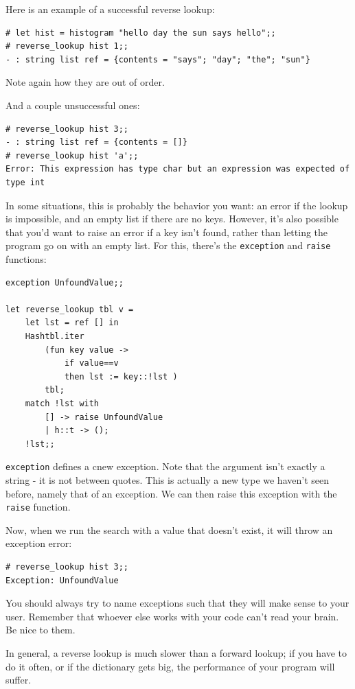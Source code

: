 \documentclass[10pt]{book}
\begin{document}
{Here is an example of a successful reverse lookup:

\beforeverb
\begin{verbatim}
# let hist = histogram "hello day the sun says hello";;
# reverse_lookup hist 1;;
- : string list ref = {contents = "says"; "day"; "the"; "sun"}
\end{verbatim}
\afterverb
%
Note again how they are out of order.

And a couple unsuccessful ones:

\beforeverb
\begin{verbatim}
# reverse_lookup hist 3;;
- : string list ref = {contents = []}
# reverse_lookup hist 'a';;
Error: This expression has type char but an expression was expected of type int
\end{verbatim}
\afterverb
%
In some situations, this is probably the behavior you want: an error if the lookup is impossible, and an empty list if there are no keys. However, it's also possible that you'd want to raise an error if a key isn't found, rather than letting the program go on with an empty list. For this, there's the {\tt exception} and {\tt raise} functions:

\beforeverb
\begin{verbatim}
exception UnfoundValue;;

let reverse_lookup tbl v = 
	let lst = ref [] in
	Hashtbl.iter
		(fun key value ->
			if value==v
			then lst := key::!lst )
		tbl;
	match !lst with
		[] -> raise UnfoundValue
		| h::t -> ();
	!lst;;
\end{verbatim}
\afterverb
{\tt exception} defines a cnew exception. Note that the argument isn't exactly a string - it is not between quotes. This is actually a new type we haven't seen before, namely that of an exception. We can then raise this exception with the {\tt raise} function.

Now, when we run the search with a value that doesn't exist, it will throw an exception error:

\beforeverb
\begin{verbatim}
# reverse_lookup hist 3;;
Exception: UnfoundValue
\end{verbatim}
\afterverb

You should always try to name exceptions such that they will make sense to your user. Remember that whoever else works with your code can't read your brain. Be nice to them.

In general, a reverse lookup is much slower than a forward lookup; if you
have to do it often, or if the dictionary gets big, the performance
of your program will suffer.

}
\end{document}
